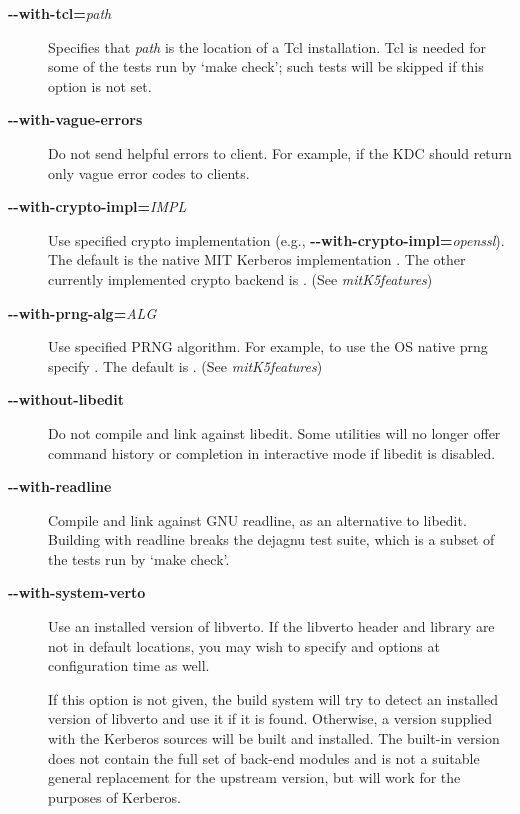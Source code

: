 \documentclass[letterpaper,10pt,english]{sphinxmanual}
\begin{document}
\begin{description}
\item[{\textbf{-}\textbf{-with-tcl=}\emph{path}}] \leavevmode
Specifies that \emph{path} is the location of a Tcl installation.
Tcl is needed for some of the tests run by `make check'; such tests
will be skipped if this option is not set.

\item[{\textbf{-}\textbf{-with-vague-errors}}] \leavevmode
Do not send helpful errors to client.  For example, if the KDC
should return only vague error codes to clients.

\item[{\textbf{-}\textbf{-with-crypto-impl=}\emph{IMPL}}] \leavevmode
Use specified crypto implementation (e.g., \textbf{-}\textbf{-with-crypto-impl=}\emph{openssl}).  The default is the native MIT
Kerberos implementation .  The other currently
implemented crypto backend is .  (See
\emph{mitK5features})

\item[{\textbf{-}\textbf{-with-prng-alg=}\emph{ALG}}] \leavevmode
Use specified PRNG algorithm.  For example, to use the OS native
prng specify .  The default is .
(See \emph{mitK5features})

\item[{\textbf{-}\textbf{-without-libedit}}] \leavevmode
Do not compile and link against libedit.  Some utilities will no
longer offer command history or completion in interactive mode if
libedit is disabled.

\item[{\textbf{-}\textbf{-with-readline}}] \leavevmode
Compile and link against GNU readline, as an alternative to libedit.
Building with readline breaks the dejagnu test suite, which is a
subset of the tests run by `make check'.

\item[{\textbf{-}\textbf{-with-system-verto}}] \leavevmode
Use an installed version of libverto.  If the libverto header and
library are not in default locations, you may wish to specify
 and  options
at configuration time as well.

If this option is not given, the build system will try to detect
an installed version of libverto and use it if it is found.
Otherwise, a version supplied with the Kerberos sources will be
built and installed.  The built-in version does not contain the
full set of back-end modules and is not a suitable general
replacement for the upstream version, but will work for the
purposes of Kerberos.


\end{description}
\end{document}
